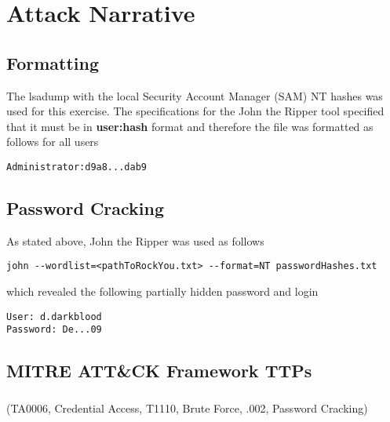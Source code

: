 \documentclass[notitlepage]{article}
\begin{document}
\section{Attack Narrative}
    \subsection{Formatting}
    The lsadump with the local Security Account Manager (SAM) NT hashes was used for this exercise. The specifications
    for the John the Ripper tool specified that it must be in \textbf{user:hash} format and therefore the file
    was formatted as follows for all users
    \begin{verbatim}
Administrator:d9a8...dab9
    \end{verbatim}

    \subsection{Password Cracking}
    As stated above, John the Ripper was used as follows 
    \begin{verbatim}
john --wordlist=<pathToRockYou.txt> --format=NT passwordHashes.txt
    \end{verbatim}
    which revealed the following partially hidden password and login
    \begin{verbatim}
User: d.darkblood
Password: De...09
    \end{verbatim}

    \subsection{MITRE ATT{\&}CK Framework TTPs}
   
   \subsubsection*{}
   \ttp(TA0006, Credential Access, T1110, Brute Force, .002, Password Cracking)
   
   
\end{document}
